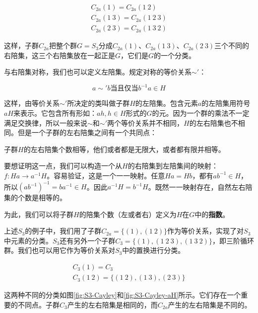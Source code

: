 \documentclass[b5paper]{ctexart}
\begin{document}
\[
\begin{array}{l}
C_{2a} (1) = C_{2a} (1\ 2) \\
C_{2a} (1\ 3) = C_{2a} (1\ 2\ 3) \\
C_{2a} (2\ 3) = C_{2a} (1\ 3\ 2)
\end{array}
\]

这样，子群$C_{2a}$把整个群$G = S_3$分成$C_{2a} (1)$、$ C_{2a} (1\ 3)$、$C_{2a} (2\ 3)$三个不同的右陪集，这三个右陪集放在一起正是$G$，它们是$G$的一个分类。

与右陪集对称，我们也可以定义左陪集。规定对称的等价关系$\sim'$：

\[
a \sim' b \text{当且仅当} b^{-1}a \in H
\]

这样，由等价关系$\sim'$所决定的类叫做子群$H$的左陪集。包含元素$a$的左陪集用符号$aH$来表示。它包含所有形如：$ah, h \in H$形式的$G$的元。因为一个群的乘法不一定满足交换律，所以一般来说$\sim$和$\sim'$两个等价关系并不相同，$H$的左右陪集也不相同。但是一个子群的左右陪集之间有一个共同点：

\begin{theorem}
子群$H$的左右陪集个数相等，他们或者都是无限大，或者都有限并相等。
\end{theorem}

要想证明这一点，我们可以构造一个从$H$的右陪集到左陪集间的映射：$f: Ha \to a^{-1}H$。容易验证，这是一个一一映射。任意$Ha = Hb$，都有$ab^{-1} \in H$，所以$(ab^{-1})^{-1} = ba^{-1} \in H$。因此$a^{-1}H= b^{-1}H$。既然一一映射存在，自然左右陪集的个数是相等的。

为此，我们可以将子群$H$的陪集个数（左或者右）定义为$H$在$G$中的\textbf{指数}。

上述$S_3$的例子中，我们用了子群$C_{2a} = \{(1), (1\ 2)\}$作为等价关系，实现了对$S_3$中元素的分类。$S_3$还有另外一个子群$C_3 = \{(1), (1\ 2\ 3), (1\ 3\ 2)\}$，即三阶循环群。我们也可以用它作为等价关系对$S_3$中的置换进行分类。

\[
\begin{array}{l}
C_3 (1) = C_3 \\
C_3 (1\ 2) = \{(1\ 2), (1\ 3), (2\ 3)\}
\end{array}
\]

这两种不同的分类如图\ref{fig:S3-Cayley}和\ref{fig:S3-Cayley-aH}所示。它们存在一个重要的不同点。子群$C_3$产生的左右陪集是相同的，而$C_{2a}$产生的左右陪集是不同的。
\end{document}
